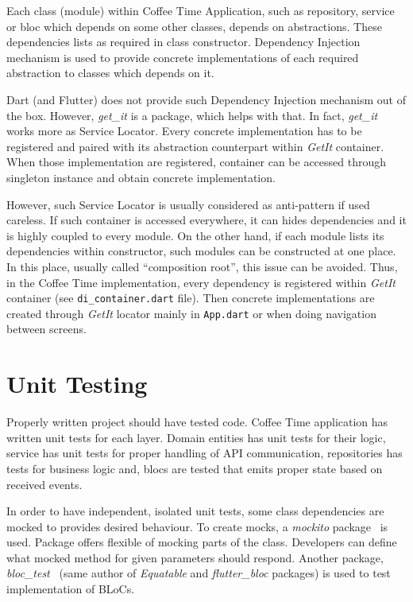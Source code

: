 Each class (module) within Coffee Time Application, such as repository, service or \gls{bloc} which depends on some other classes, depends on abstractions. These dependencies lists as required in class constructor. Dependency Injection mechanism is used to provide concrete implementations of each required abstraction to classes which depends on it. 

Dart (and Flutter) does not provide such Dependency Injection mechanism out of the box. However, \textit{get\_it} is a package, which helps with that. In fact, \textit{get\_it} works more as Service Locator. Every concrete implementation has to be registered and paired with its abstraction counterpart within \textit{GetIt} container. When those implementation are registered, container can be accessed through singleton instance and obtain concrete implementation.

However, such Service Locator is usually considered as anti-pattern if used careless. If such container is accessed everywhere, it can hides dependencies and it is highly coupled to every module. On the other hand, if each module lists its dependencies within constructor, such modules can be constructed at one place. In this place, usually called ``composition root'', this issue can be avoided. Thus, in the Coffee Time implementation, every dependency is registered within \textit{GetIt} container (see \verb|di_container.dart| file). Then concrete implementations are created through \textit{GetIt} locator mainly in \verb|App.dart| or when doing navigation between screens. 

\section{Unit Testing}
Properly written project should have tested code. Coffee Time application has written unit tests for each layer. Domain entities has unit tests for their logic, service has unit tests for proper handling of API communication, repositories has tests for business logic and, \gls{bloc}s are tested that emits proper state based on received events. 

In order to have independent, isolated unit tests, some class dependencies are mocked to provides desired behaviour. To create mocks, a \textit{mockito} package~\cite{package-mockito} is used. Package offers flexible of mocking parts of the class. Developers can define what mocked method for given parameters should respond. Another package, \textit{bloc\_test}~\cite{package-bloctest} (same author of \textit{Equatable} and \textit{flutter\_bloc} packages) is used to test implementation of BLoCs. 

